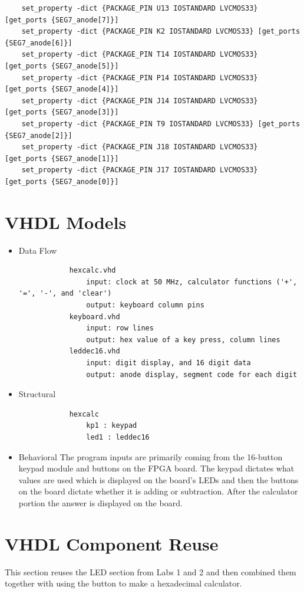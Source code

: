\begin{verbatim}
    set_property -dict {PACKAGE_PIN U13 IOSTANDARD LVCMOS33} [get_ports {SEG7_anode[7]}]
    set_property -dict {PACKAGE_PIN K2 IOSTANDARD LVCMOS33} [get_ports {SEG7_anode[6]}]
    set_property -dict {PACKAGE_PIN T14 IOSTANDARD LVCMOS33} [get_ports {SEG7_anode[5]}]
    set_property -dict {PACKAGE_PIN P14 IOSTANDARD LVCMOS33} [get_ports {SEG7_anode[4]}]
    set_property -dict {PACKAGE_PIN J14 IOSTANDARD LVCMOS33} [get_ports {SEG7_anode[3]}]
    set_property -dict {PACKAGE_PIN T9 IOSTANDARD LVCMOS33} [get_ports {SEG7_anode[2]}]
    set_property -dict {PACKAGE_PIN J18 IOSTANDARD LVCMOS33} [get_ports {SEG7_anode[1]}]
    set_property -dict {PACKAGE_PIN J17 IOSTANDARD LVCMOS33} [get_ports {SEG7_anode[0]}]
 \end{verbatim}
 \section{VHDL Models}
 \begin{itemize}
     \item Data Flow
        \begin{verbatim}
            hexcalc.vhd
                input: clock at 50 MHz, calculator functions ('+', '=', '-', and 'clear')
                output: keyboard column pins 
            keyboard.vhd
                input: row lines
                output: hex value of a key press, column lines
            leddec16.vhd
                input: digit display, and 16 digit data
                output: anode display, segment code for each digit
        \end{verbatim}
     \item Structural
        \begin{verbatim}
            hexcalc
                kp1 : keypad
                led1 : leddec16
        \end{verbatim}
     \item Behavioral
        The program inputs are primarily coming from the 16-button keypad module and buttons on the FPGA board. The keypad dictates what values are used which is displayed on the board's LEDs and then the buttons on the board dictate whether it is adding or subtraction. After the calculator portion the answer is displayed on the board. 
\end{itemize}
 \section{VHDL Component Reuse}
    This section reuses the LED section from Labs 1 and 2 and then combined them together with using the button to make a hexadecimal calculator.
